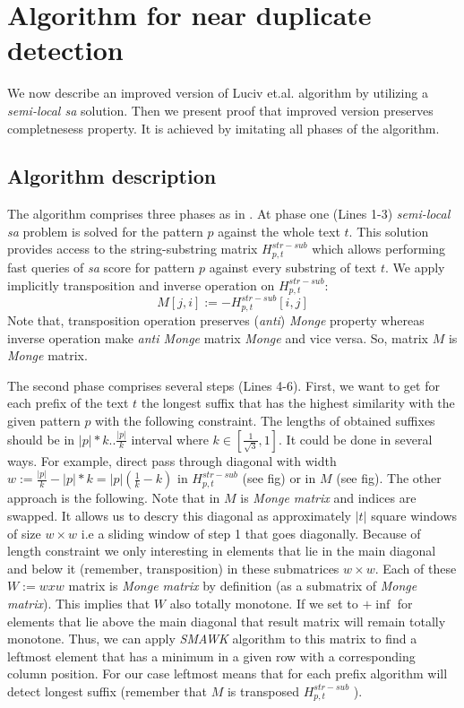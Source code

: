 \section{Algorithm for near duplicate detection}
\label{section:luciv}

We now describe an improved version of Luciv et.al. algorithm \cite{luciv2019interactive} by utilizing a \emph{semi-local sa} solution.
Then we present proof that improved version preserves completnesess property.
It is achieved by imitating all phases of the algorithm. 
 

\subsection{Algorithm description}

The algorithm comprises three phases as in \cite{luciv2019interactive}.
At phase one (Lines 1-3) \emph{semi-local sa} problem is solved for the pattern $p$ against the whole text $t$.
This solution provides access to the string-substring matrix $H^{str-sub}_{p,t}$ which allows performing fast queries of \emph{sa} score for pattern $p$ against every substring of text $t$.
We apply implicitly transposition and inverse operation on $H^{str-sub}_{p,t}$:
\begin{equation}
	M[j,i]:= -H^{str-sub}_{p,t}[i,j]
\end{equation}
Note that, transposition operation preserves (\emph{anti}) \emph{Monge} property whereas inverse operation make \emph{anti Monge} matrix \emph{Monge} and vice versa. 
So, matrix $M$ is \emph{Monge} matrix.

The second phase comprises several steps (Lines 4-6).
First, we want to get for each prefix of the text $t$ the longest suffix that has the highest similarity with the given pattern $p$ with the following constraint.
The lengths of obtained suffixes should be in $|p|*k..\frac{|p|}{k}$ interval where $k \in [\frac{1}{\sqrt{3}},1]$.
It could be done in several ways.
For example, direct pass through diagonal with width $w:= \frac{|p|}{k} - |p|*k = |p|(\frac{1}{k} - k)$ in $H^{str-sub}_{p,t}$ (see fig) or in $M$ (see fig).
The other approach is the following.
Note that in  $M$ is \emph{Monge matrix} and indices are swapped.
It allows us to descry this diagonal as approximately $|t|$ square windows of size $w \times w$ i.e a sliding window of step 1 that goes diagonally.
Because of length constraint we only interesting in elements that lie in the main diagonal and below it (remember, transposition) in these submatrices $w\times w$.
Each of these $W:=wxw$ matrix is \emph{Monge matrix} by definition (as a submatrix of \emph{Monge matrix}).
This implies that $W$ also totally monotone.
If we set to $+\inf$ for elements that lie above the main diagonal that result matrix will remain totally monotone.
Thus, we can apply \emph{SMAWK} algorithm to this matrix to find a leftmost element that has a minimum in a given row with a corresponding column position.
For our case leftmost means that for each prefix algorithm will detect longest suffix (remember that $M$ is transposed $H^{str-sub}_{p,t}$ ).

